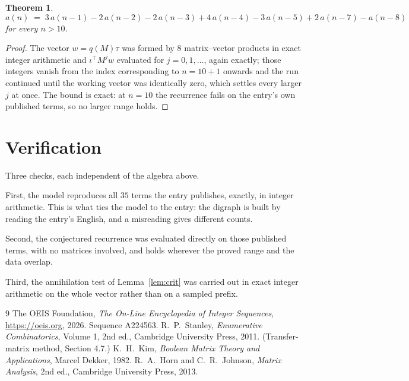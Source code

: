 \documentclass[11pt,a4paper]{article}
\theoremstyle{plain}
\newtheorem{theorem}{Theorem}
\theoremstyle{definition}
\begin{document}
\begin{theorem}
\[
a(n)\;=\;3\,a(n-1) - 2\,a(n-2) - 2\,a(n-3) + 4\,a(n-4) - 3\,a(n-5) + 2\,a(n-7) - a(n-8)
\]
for every $n>10$.
\end{theorem}

\begin{proof}
The vector $w=q(M)\tau$ was formed by $8$ matrix--vector products in exact integer
arithmetic and $\iota^{\!\top}M^{j}w$ evaluated for $j=0,1,\dots$, again exactly; those
integers vanish from the index corresponding to $n=10+1$ onwards and the run continued
until the working vector was identically zero, which settles every larger $j$ at once. The bound is exact: at $n=10$ the recurrence fails on the entry's own published terms, so no larger range holds.
\end{proof}

\section{Verification}

Three checks, each independent of the algebra above.

First, the model reproduces all $35$ terms the entry publishes, exactly, in integer
arithmetic. This is what ties the model to the entry: the digraph is built by reading the
entry's English, and a misreading gives different counts.

Second, the conjectured recurrence was evaluated directly on those published terms, with no
matrices involved, and holds wherever the proved range and the data overlap.

Third, the annihilation test of Lemma~\ref{lem:crit} was carried out in exact integer
arithmetic on the whole vector rather than on a sampled prefix.

\begin{thebibliography}{9}
 The OEIS Foundation, \emph{The On-Line Encyclopedia of Integer
Sequences}, \url{https://oeis.org}, 2026. Sequence A224563.
 R.~P.~Stanley, \emph{Enumerative Combinatorics}, Volume 1, 2nd ed.,
Cambridge University Press, 2011. (Transfer-matrix method, Section 4.7.)
 K.~H.~Kim, \emph{Boolean Matrix Theory and Applications}, Marcel Dekker,
1982.
 R.~A.~Horn and C.~R.~Johnson, \emph{Matrix Analysis}, 2nd ed., Cambridge
University Press, 2013.
\end{thebibliography}
\end{document}

